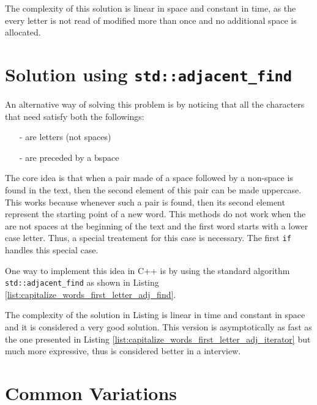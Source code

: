 The complexity of this solution is linear in space and constant in time, as the every letter is not read of modified more than once and no additional space is allocated.

\section{Solution using \texttt{std::adjacent\_find}}

An alternative way of solving this problem is by noticing that all the characters that need satisfy both the followings:
\begin{itemize}
    \item [-] are letters (not spaces)
    \item [-] are preceded by a bspace
\end{itemize}
The core idea is that when a pair made of a space followed by a  non-space is  found in the text, then the second element of this pair can be made uppercase. This works because whenever such a pair is found, then its second element represent the starting point of a new word. This methods do not work when the are not spaces at the beginning of the text and the first word starts with a lower case letter. Thus, a special treatement for this case is necessary. The first \lstinline[columns=fixed]{if} handles this special case.

One way to implement this idea in C++ is by using the standard algorithm \lstinline[columns=fixed]{std::adjacent_find} as shown in Listing \ref{list:capitalize_words_first_letter_adj_find}.




The complexity of the solution in Listing is linear in time and constant in space and it is considered a very good solution. This version is asymptotically as fast  as the one presented in Listing \ref{list:capitalize_words_first_letter_adj_iterator} but much more expressive, thus is considered better in a interview.

\section{Common Variations}
\label{capitalize_words_first_letter:sec:variation}

